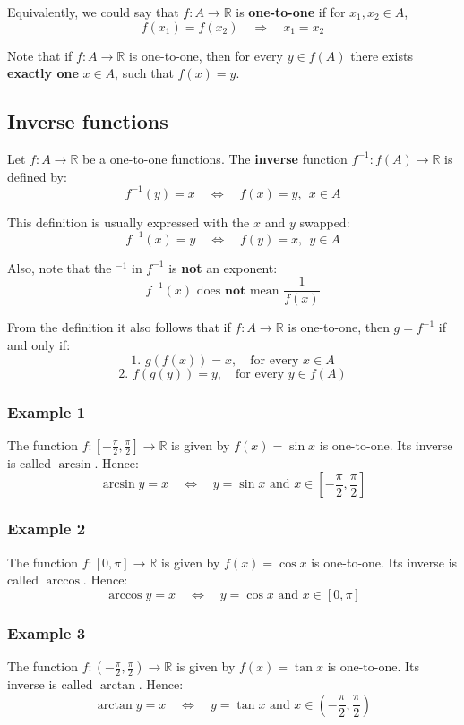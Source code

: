 \documentclass[11pt]{article}
\begin{document}
Equivalently, we could say that \(f : A \rightarrow \mathbb{R}\) is \textbf{one-to-one} if for \(x_1, x_2 \in A\),
\[f(x_1) = f(x_2) \quad \Rightarrow \quad x_1 = x_2\]

Note that if \(f : A \rightarrow \mathbb{R}\) is one-to-one, then for every \(y \in f(A)\) there exists \textbf{exactly one} \(x \in A\), such that \(f(x) = y\).

\subsection{Inverse functions}
\label{sec:org6c65d66}
Let \(f : A \rightarrow \mathbb{R}\) be a one-to-one functions. The \textbf{inverse} function \(f^{-1} : f(A) \rightarrow \mathbb{R}\) is defined by:
\[f^{-1} (y) = x \quad \Leftrightarrow \quad f(x) = y, \ \ x \in A\]

This definition is usually expressed with the \(x\) and \(y\) swapped:
\[f^{-1} (x) = y \quad \Leftrightarrow \quad f(y) = x, \ \ y \in A\]

Also, note that the \(^{-1}\) in \(f^{-1}\) is \textbf{not} an exponent:
\[f^{-1} (x) \text{ does } \textbf{not } \text{mean } \frac{1}{f(x)}\]

From the definition it also follows that if \(f : A \rightarrow \mathbb{R}\) is one-to-one, then \(g = f^{-1}\) if and only if:
\[\text{1. } g(f(x)) = x, \quad \text{for every } x \in A\]
\[\text{2. } f(g(y)) = y, \quad \text{for every } y \in f(A)\]

\subsubsection{Example 1}
\label{sec:orgcc8cf82}
The function \(f : [-\frac{\pi}{2}, \frac{\pi}{2}] \rightarrow \mathbb{R}\) is given by \(f(x) = \sin x\) is one-to-one. Its inverse is called \(\arcsin\). Hence:
\[\arcsin y = x \quad \Leftrightarrow \quad y = \sin x \text{ and } x \in \left[-\frac{\pi}{2}, \frac{\pi}{2} \right]\]

\subsubsection{Example 2}
\label{sec:orga9655f5}
The function \(f : [0, \pi] \rightarrow \mathbb{R}\) is given by \(f(x) = \cos x\) is one-to-one. Its inverse is called \(\arccos\). Hence:
\[\arccos y = x \quad \Leftrightarrow \quad y = \cos x \text{ and } x \in [0, \pi]\]

\subsubsection{Example 3}
\label{sec:org9b06f3c}
The function \(f : (-\frac{\pi}{2}, \frac{\pi}{2}) \rightarrow \mathbb{R}\) is given by \(f(x) = \tan x\) is one-to-one. Its inverse is called \(\arctan\). Hence:
\[\arctan y = x \quad \Leftrightarrow \quad y = \tan x \text{ and } x \in \left(-\frac{\pi}{2}, \frac{\pi}{2} \right)\]
\end{document}
